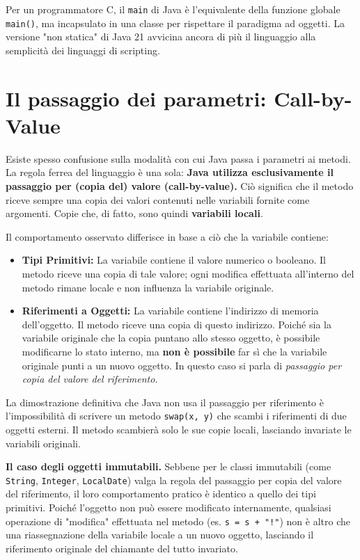 \begin{observation}
    Per un programmatore C, il \texttt{main} di Java è l'equivalente della funzione globale \texttt{main()}, ma incapsulato in una classe per rispettare il paradigma ad oggetti. La versione "non statica" di Java 21 avvicina ancora di più il linguaggio alla semplicità dei linguaggi di scripting.
\end{observation}

\section{Il passaggio dei parametri: Call-by-Value}

Esiste spesso confusione sulla modalità con cui Java passa i parametri ai metodi. La regola ferrea del linguaggio è una sola: \textbf{Java utilizza esclusivamente il passaggio per (copia del) valore (call-by-value).} Ciò significa che il metodo riceve sempre una copia dei valori contenuti nelle variabili fornite come argomenti. Copie che, di fatto, sono quindi \textbf{variabili locali}.

Il comportamento osservato differisce in base a ciò che la variabile contiene:
\begin{itemize}
    \item \textbf{Tipi Primitivi:} La variabile contiene il valore numerico o booleano. Il metodo riceve una copia di tale valore; ogni modifica effettuata all'interno del metodo rimane locale e non influenza la variabile originale.
    \item \textbf{Riferimenti a Oggetti:} La variabile contiene l'indirizzo di memoria dell'oggetto. Il metodo riceve una copia di questo indirizzo. Poiché sia la variabile originale che la copia puntano allo stesso oggetto, è possibile modificarne lo stato interno, ma \textbf{non è possibile} far sì che la variabile originale punti a un nuovo oggetto. In questo caso si parla di \textit{passaggio per copia del valore del riferimento}.
\end{itemize}

\begin{tip}
    La dimostrazione definitiva che Java non usa il passaggio per riferimento è l'impossibilità di scrivere un metodo \texttt{swap(x, y)} che scambi i riferimenti di due oggetti esterni. Il metodo scambierà solo le sue copie locali, lasciando invariate le variabili originali.
\end{tip}

\begin{observation}
    \textbf{Il caso degli oggetti immutabili.}
    Sebbene per le classi immutabili (come \texttt{String}, \texttt{Integer}, \texttt{LocalDate}) valga la regola del passaggio per copia del valore del riferimento, il loro comportamento pratico è identico a quello dei tipi primitivi. Poiché l'oggetto non può essere modificato internamente, qualsiasi operazione di "modifica" effettuata nel metodo (es. \texttt{s = s + "!"}) non è altro che una riassegnazione della variabile locale a un nuovo oggetto, lasciando il riferimento originale del chiamante del tutto invariato.
\end{observation}

